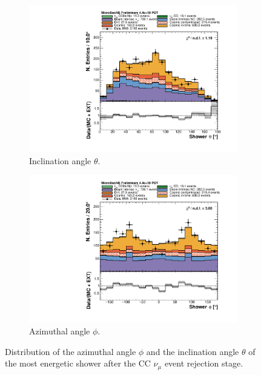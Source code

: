 \begin{figure}[htbp]
\centering
  \begin{subfigure}{0.45\textwidth}
    \includegraphics[width=\linewidth]{figures/h_shower_theta.pdf}
    \caption{Inclination angle $\theta$.} 
  \end{subfigure}
    \begin{subfigure}{0.45\textwidth}
    \includegraphics[width=\linewidth]{figures/h_shower_phi.pdf}
    \caption{Azimuthal angle $\phi$.} 
  \end{subfigure}
  \caption{Distribution of the azimuthal angle $\phi$ and the inclination angle $\theta$ of the most energetic shower after the CC \texorpdfstring{$\nu_{\mu}$}{numu} event rejection stage.}\label{fig:thetaphi}
\end{figure}



